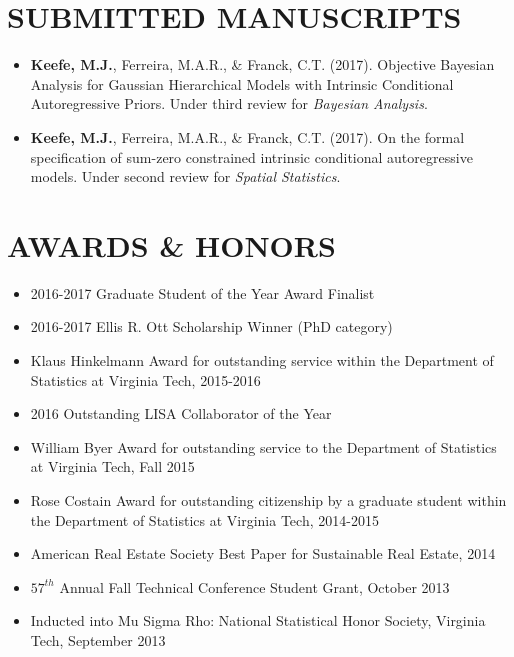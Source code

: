 \documentclass[10pt]{article}
\begin{document}
\section*{SUBMITTED MANUSCRIPTS}
\begin{itemize}
\item[] \textbf{Keefe, M.J.}, Ferreira, M.A.R., \& Franck, C.T. (2017). Objective Bayesian Analysis for Gaussian Hierarchical Models with Intrinsic Conditional Autoregressive Priors. Under third review for \textit{Bayesian Analysis}.
\item[] \textbf{Keefe, M.J.}, Ferreira, M.A.R., \& Franck, C.T. (2017). On the formal specification of sum-zero constrained intrinsic conditional autoregressive models. Under second review for \textit{Spatial Statistics}.


\end{itemize}
\section*{AWARDS \& HONORS}
\begin{itemize}
\item 2016-2017 Graduate Student of the Year Award Finalist
\item 2016-2017 Ellis R. Ott Scholarship Winner (PhD category)
\item Klaus Hinkelmann Award for outstanding service within the Department of Statistics at Virginia Tech, 2015-2016
\item 2016 Outstanding LISA Collaborator of the Year
\item William Byer Award for outstanding service to the Department of Statistics at Virginia Tech, Fall 2015
\item Rose Costain Award for outstanding citizenship by a graduate student within the Department of Statistics at Virginia Tech, 2014-2015
\item American Real Estate Society Best Paper for Sustainable Real Estate, 2014
\item $57^{th}$ Annual Fall Technical Conference Student Grant, October 2013
\item Inducted into Mu Sigma Rho: National Statistical Honor Society, Virginia Tech, September 2013

\end{itemize}
\end{document}
